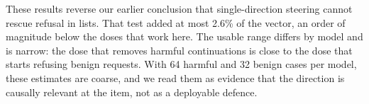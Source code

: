 These results reverse our earlier conclusion that single-direction steering cannot rescue refusal in lists.
That test added at most 2.6\% of the vector, an order of magnitude below the doses that work here. The usable
range differs by model and is narrow: the dose that removes harmful continuations is close to the dose that
starts refusing benign requests. With 64 harmful and 32 benign cases per model, these estimates are coarse,
and we read them as evidence that the direction is causally relevant at the item, not as a deployable
defence.
